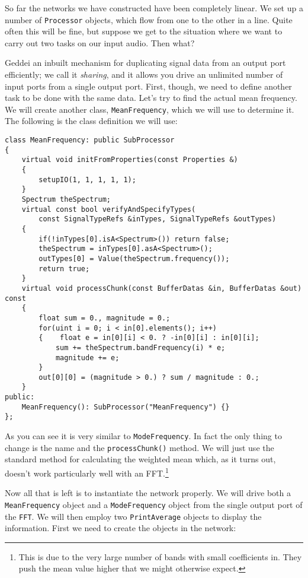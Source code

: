 So far the networks we have constructed have been completely linear. We set up a number of \texttt{Processor} objects, which flow from one to the other in a line. Quite often this will be fine, but suppose we get to the situation where we want to carry out two tasks on our input audio. Then what?

Geddei an inbuilt mechanism for duplicating signal data from an output port efficiently; we call it \textit{sharing}, and it allows you drive an unlimited number of input ports from a single output port. First, though, we need to define another task to be done with the same data. Let's try to find the actual mean frequency. We will create another class, \texttt{MeanFrequency}, which we will use to determine it. The following is the class definition we will use:

\begin{verbatim}
class MeanFrequency: public SubProcessor
{
    virtual void initFromProperties(const Properties &)
    {
        setupIO(1, 1, 1, 1, 1);
    }
    Spectrum theSpectrum;
    virtual const bool verifyAndSpecifyTypes(
        const SignalTypeRefs &inTypes, SignalTypeRefs &outTypes)
    {
        if(!inTypes[0].isA<Spectrum>()) return false;
        theSpectrum = inTypes[0].asA<Spectrum>();
        outTypes[0] = Value(theSpectrum.frequency());
        return true;
    }
    virtual void processChunk(const BufferDatas &in, BufferDatas &out) const
    {
        float sum = 0., magnitude = 0.;
        for(uint i = 0; i < in[0].elements(); i++)
        {    float e = in[0][i] < 0. ? -in[0][i] : in[0][i];
            sum += theSpectrum.bandFrequency(i) * e;
            magnitude += e;
        }
        out[0][0] = (magnitude > 0.) ? sum / magnitude : 0.;
    }
public:
    MeanFrequency(): SubProcessor("MeanFrequency") {}
};
\end{verbatim}

As you can see it is very similar to \texttt{ModeFrequency}. In fact the only thing to change is the name and the \texttt{processChunk()} method. We will just use the standard method for calculating the weighted mean which, as it turns out, doesn't work particularly well with an FFT.\footnote{This is due to the very large number of bands with small coefficients in. They push the mean value higher that we might otherwise expect.}

Now all that is left is to instantiate the network properly. We will drive both a \texttt{MeanFrequency} object and a \texttt{ModeFrequency} object from the single output port of the \texttt{FFT}. We will then employ two \texttt{PrintAverage} objects to display the information. First we need to create the objects in the network:


